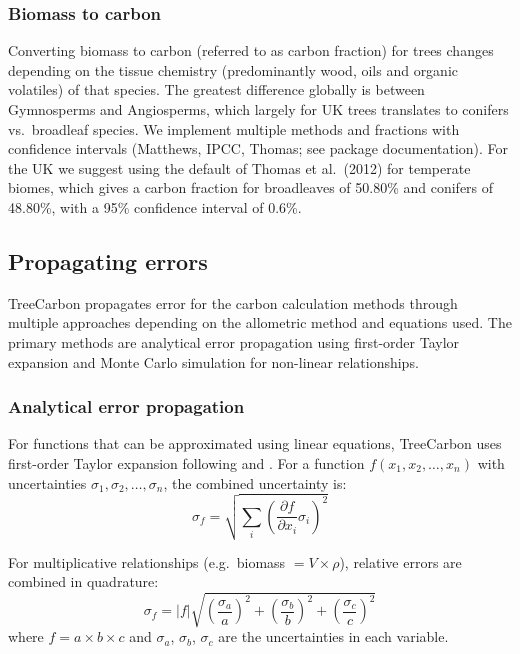 \documentclass[12pt,a4paper]{article}
\begin{document}
\subsubsection{Biomass to carbon}

Converting biomass to carbon (referred to as carbon fraction) for trees changes depending on the tissue chemistry (predominantly wood, oils and organic volatiles) of that species. The greatest difference globally is between Gymnosperms and Angiosperms, which largely for UK trees translates to conifers vs.\ broadleaf species. We implement multiple methods and fractions with confidence intervals (Matthews, IPCC, Thomas; see package documentation). For the UK we suggest using the default of Thomas et al.\ (2012) for temperate biomes, which gives a carbon fraction for broadleaves of 50.80\% and conifers of 48.80\%, with a 95\% confidence interval of 0.6\%.

\subsection{Propagating errors}

TreeCarbon propagates error for the carbon calculation methods through multiple approaches depending on the allometric method and equations used. The primary methods are analytical error propagation using first-order Taylor expansion and Monte Carlo simulation for non-linear relationships.

\subsubsection{Analytical error propagation}

For functions that can be approximated using linear equations, TreeCarbon uses first-order Taylor expansion following \citet{Chave2004} and \citet{Taylor1997}. For a function $f(x_1, x_2, \ldots, x_n)$ with uncertainties $\sigma_1, \sigma_2, \ldots, \sigma_n$, the combined uncertainty is:
\begin{equation}
  \sigma_f = \sqrt{\sum_i \left( \frac{\partial f}{\partial x_i} \sigma_i \right)^2}
\end{equation}

For multiplicative relationships (e.g.\ biomass $= V \times \rho$), relative errors are combined in quadrature:
\begin{equation}
  \sigma_f = |f| \sqrt{\left(\frac{\sigma_a}{a}\right)^2 + \left(\frac{\sigma_b}{b}\right)^2 + \left(\frac{\sigma_c}{c}\right)^2}
\end{equation}
where $f = a \times b \times c$ and $\sigma_a$, $\sigma_b$, $\sigma_c$ are the uncertainties in each variable.
\end{document}
